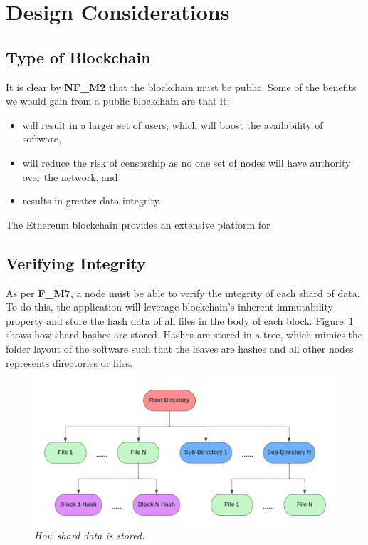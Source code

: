 
\section{Design Considerations}

\subsection{Type of Blockchain}

It is clear by \textbf{NF\_M2} that the blockchain must be public. Some of the benefits we would gain from a public blockchain are that it:

\begin{itemize}
  \item will result in a larger set of users, which will boost the availability of software,
  \item will reduce the risk of censorship as no one set of nodes will have authority over the network, and
  \item results in greater data integrity.
\end{itemize}

The Ethereum blockchain provides an extensive platform for 

\subsection{Verifying Integrity}

As per \textbf{F\_M7}, a node must be able to verify the integrity of each shard of data. To do this, the application will leverage blockchain's inherent immutability property and store the hash data of all files in the body of each block.
\x
Figure~\ref{fig:hash-storage} shows how shard hashes are stored. Hashes are stored in a tree, which mimics the folder layout of the software such that the leaves are hashes and all other nodes represents directories or files. 

\begin{figure}[ht]
  \centering
  \includegraphics[width=.85\textwidth]{diagrams/block-body.png}
  \caption{\textit{How shard data is stored.}}
  \label{fig:hash-storage}
\end{figure}

